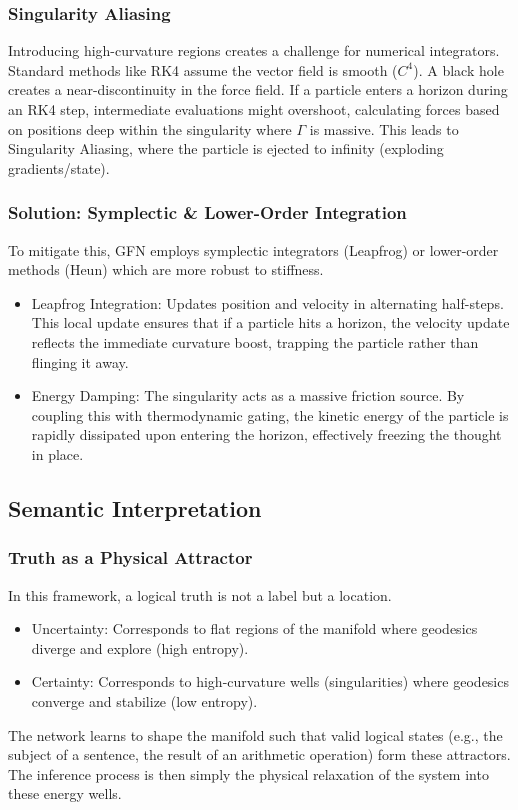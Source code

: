 \documentclass{article}
\numberwithin{equation}{section}
\begin{document}
\subsubsection{Singularity Aliasing}
Introducing high-curvature regions creates a challenge for numerical integrators. Standard methods like RK4 assume the vector field is smooth ($C^4$). A black hole creates a near-discontinuity in the force field. If a particle enters a horizon during an RK4 step, intermediate evaluations might overshoot, calculating forces based on positions deep within the singularity where $\Gamma$ is massive. This leads to Singularity Aliasing, where the particle is ejected to infinity (exploding gradients/state).

\subsubsection{Solution: Symplectic \& Lower-Order Integration}
To mitigate this, GFN employs symplectic integrators (Leapfrog) or lower-order methods (Heun) which are more robust to stiffness.
\begin{itemize}
\item Leapfrog Integration: Updates position and velocity in alternating half-steps. This local update ensures that if a particle hits a horizon, the velocity update reflects the immediate curvature boost, trapping the particle rather than flinging it away.
\item Energy Damping: The singularity acts as a massive friction source. By coupling this with thermodynamic gating, the kinetic energy of the particle is rapidly dissipated upon entering the horizon, effectively freezing the thought in place.
\end{itemize}

\subsection{Semantic Interpretation}
\subsubsection{Truth as a Physical Attractor}
In this framework, a logical truth is not a label but a location.
\begin{itemize}
\item Uncertainty: Corresponds to flat regions of the manifold where geodesics diverge and explore (high entropy).
\item Certainty: Corresponds to high-curvature wells (singularities) where geodesics converge and stabilize (low entropy).
\end{itemize}
The network learns to shape the manifold such that valid logical states (e.g., the subject of a sentence, the result of an arithmetic operation) form these attractors. The inference process is then simply the physical relaxation of the system into these energy wells.
\end{document}
